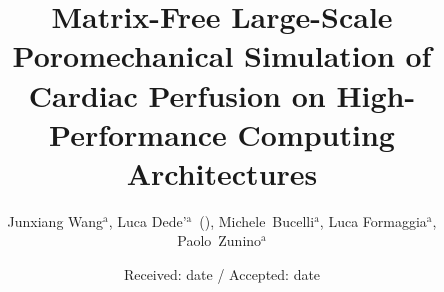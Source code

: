 \documentclass[smallcondensed]{svjour3}     %
\begin{document}
\title{Matrix-Free Large-Scale Poromechanical Simulation of Cardiac Perfusion on High-Performance Computing Architectures}

%

\subtitle{}


\author{Junxiang Wang$^\text{a}$,  Luca Dede'$^\text{a}$~(\Letter), Michele~Bucelli$^\text{a}$, Luca Formaggia$^\text{a}$, Paolo~Zunino$^\text{a}$}


\enlargethispage*{5cm}


\date{Received: date / Accepted: date}

\maketitle
\end{document}
